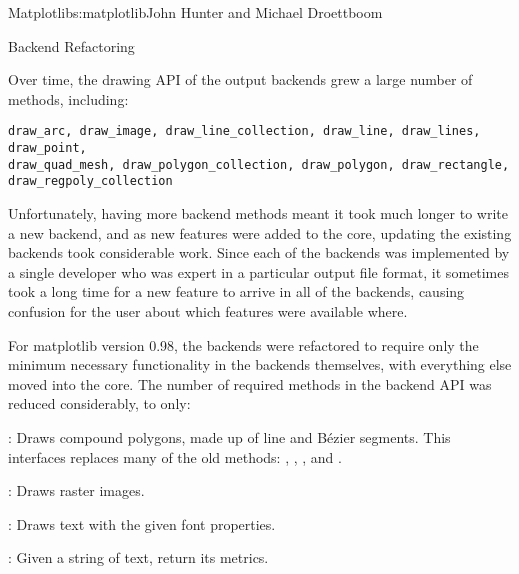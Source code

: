 \begin{aosachapter}{Matplotlib}{s:matplotlib}{John Hunter and Michael Droettboom}
\begin{aosasect1}{Backend Refactoring}


Over time, the drawing API of the output backends grew a large number
of methods, including:

\begin{verbatim}
draw_arc, draw_image, draw_line_collection, draw_line, draw_lines, draw_point,
draw_quad_mesh, draw_polygon_collection, draw_polygon, draw_rectangle,
draw_regpoly_collection
\end{verbatim}

Unfortunately, having more backend methods meant it took much longer
to write a new backend, and as new features were added to the core,
updating the existing backends took considerable work.  Since each of
the backends was implemented by a single developer who was expert in a
particular output file format, it sometimes took a long time for a new
feature to arrive in all of the backends, causing confusion for the
user about which features were available where.

For matplotlib version 0.98, the backends were refactored to require
only the minimum necessary functionality in the backends themselves,
with everything else moved into the core.  The number of required
methods in the backend API was reduced considerably, to only:

\begin{aosaitemize}

  \item {}: Draws compound polygons, made up of line and
    B\'ezier segments.  This interfaces replaces many of the old
    methods: , , ,
    and .

  \item {}: Draws raster images.

  \item {}: Draws text with the given font properties.

  \item {}: Given a string of
    text, return its metrics.

\end{aosaitemize}


\end{aosasect1}
\end{aosachapter}
